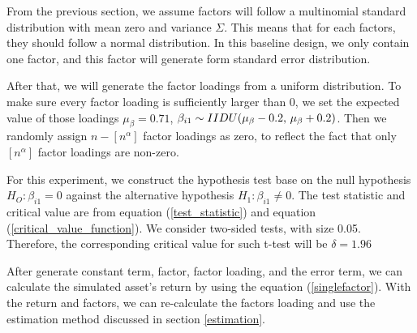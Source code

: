 \documentclass[12pt]{article}
\begin{document}
From the previous section, we assume factors will follow a multinomial standard distribution with mean zero and variance $\Sigma$.
This means that for each factors, they should follow a normal distribution.
In this baseline design, we only contain one factor, and this factor will generate form standard error distribution.

After that, we will generate the factor loadings from a uniform distribution.
To make sure every factor loading is sufficiently larger than 0, we set the expected value of those loadings  $\mu_{\beta} = 0.71$, $\beta_{i1} \sim \mathnormal{IIDU}(\mu_{\beta}-0.2,\, \mu_{\beta}+0.2)$.
Then we randomly assign $n - [n^\alpha]$ factor loadings as zero, to reflect the fact that only $[n^\alpha]$ factor loadings are non-zero.


For this experiment, we construct the hypothesis test base on the null hypothesis $H_O:\beta_{i1} = 0$ against the alternative hypothesis $H_1:\beta_{i1}\neq0$.
The  test statistic and critical value are from equation (\ref{test_statistic}) and equation (\ref{critical_value_function}).
We consider two-sided tests, with size 0.05.
Therefore, the corresponding critical value for such t-test will be $\delta = 1.96$



After generate constant term, factor, factor loading, and the error term, we can calculate the simulated asset's return by using the equation (\ref{singlefactor}).
With the return and factors, we can re-calculate the factors loading and use the estimation method discussed in section \ref{estimation}.


\end{document}

